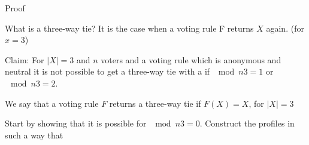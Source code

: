 \documentclass[12pt]{article}
\newenvironment{question}[2][Question]{\begin{trivlist}
\item[\hskip \labelsep {\bfseries #1}\hskip \labelsep {\bfseries #2.}]}{\end{trivlist}}
\newenvironment{answer}[2][Answer]{\begin{trivlist}
\item[\hskip \labelsep {\bfseries #1}\hskip \labelsep {\bfseries #2:}]}{\end{trivlist}}
\begin{document}
\begin{answer}{a)}{Proof}

What is a three-way tie? It is the case when a voting rule F returns $X$ again. (for $x=3$)

Claim: For $|X| = 3$ and $n$ voters and a voting rule which is anonymous and neutral it is not possible to get a three-way tie with a if $\mod{n}{3}=1$ or $\mod{n}{3}=2$.

We say that a voting rule $F$ returns a three-way tie if $F(X)=X$, for $|X| = 3$

Start by showing that it is possible for $\mod{n}{3}=0$. Construct the profiles in such a way that
\end{answer}

\begin{question}{3}{}

\end{question}
\end{document}
